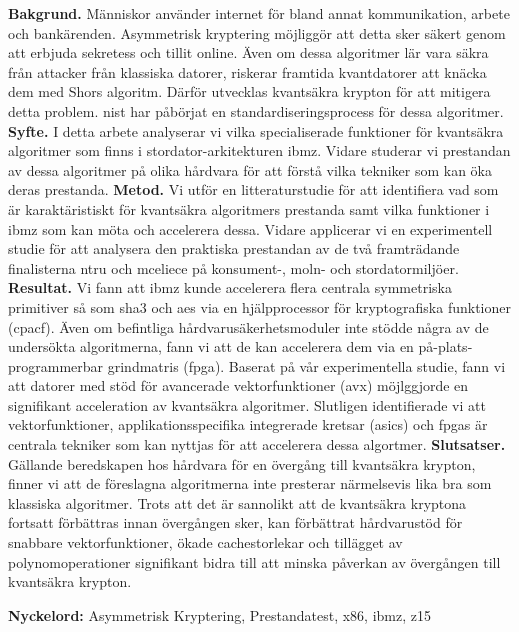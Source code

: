\sammanfattning
\noindent
\textbf{Bakgrund.} Människor använder internet för bland annat kommunikation, arbete och bankärenden. Asymmetrisk kryptering möjliggör att detta sker säkert genom att erbjuda sekretess och tillit online. Även om dessa algoritmer lär vara säkra från attacker från klassiska datorer, riskerar framtida kvantdatorer att knäcka dem med Shors algoritm. Därför utvecklas kvantsäkra krypton för att mitigera detta problem. \acrfull{nist} har påbörjat en standardiseringsprocess för dessa algoritmer.\newline
\textbf{Syfte.} I detta arbete analyserar vi vilka specialiserade funktioner för kvantsäkra algoritmer som finns i stordator-arkitekturen \gls{ibmz}. Vidare studerar vi prestandan av dessa algoritmer på olika hårdvara för att förstå vilka tekniker som kan öka deras prestanda.\newline
\textbf{Metod.} Vi utför en litteraturstudie för att identifiera vad som är karaktäristiskt för kvantsäkra algoritmers prestanda samt vilka funktioner i \gls{ibmz} som kan möta och accelerera dessa. Vidare applicerar vi en experimentell studie för att analysera den praktiska prestandan av de två framträdande finalisterna \gls{ntru} och \gls{mceliece} på konsument-, moln- och stordatormiljöer.\newline
\textbf{Resultat.} Vi fann att \gls{ibmz} kunde accelerera flera centrala symmetriska primitiver så som \gls{sha3} och \gls{aes} via en hjälpprocessor för kryptografiska funktioner (\acrshort{cpacf}). Även om befintliga hårdvarusäkerhetsmoduler inte stödde några av de undersökta algoritmerna, fann vi att de kan accelerera dem via en på-plats-programmerbar grindmatris (\acrshort{fpga}). Baserat på vår experimentella studie, fann vi att datorer med stöd för avancerade vektorfunktioner (\gls{avx}) möjlggjorde en signifikant acceleration av kvantsäkra algoritmer. Slutligen identifierade vi att vektorfunktioner, applikationsspecifika integrerade kretsar (\acrshort{asic}s) och \acrshort{fpga}s är centrala tekniker som kan nyttjas för att accelerera dessa algortmer.\newline
\textbf{Slutsatser.} Gällande beredskapen hos hårdvara för en övergång till kvantsäkra krypton, finner vi att de föreslagna algoritmerna inte presterar närmelsevis lika bra som klassiska algoritmer. Trots att det är sannolikt att de kvantsäkra kryptona fortsatt förbättras innan övergången sker, kan förbättrat hårdvarustöd för snabbare vektorfunktioner, ökade cachestorlekar och tillägget av polynomoperationer signifikant bidra till att minska påverkan av övergången till kvantsäkra krypton.

\vspace{1cm}
\noindent
\textbf{Nyckelord:} Asymmetrisk Kryptering, Prestandatest, \gls{x86}, \gls{ibmz}, \gls{z15}

\cleardoublepage